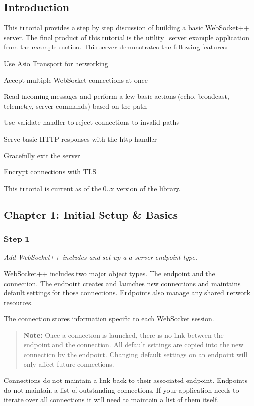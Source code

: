 \subsection*{Introduction }

This tutorial provides a step by step discussion of building a basic Web\+Socket++ server. The final product of this tutorial is the \mbox{\hyperlink{classutility__server}{utility\+\_\+server}} example application from the example section. This server demonstrates the following features\+:


\begin{DoxyItemize}
\item Use Asio Transport for networking
\item Accept multiple Web\+Socket connections at once
\item Read incoming messages and perform a few basic actions (echo, broadcast, telemetry, server commands) based on the path
\item Use validate handler to reject connections to invalid paths
\item Serve basic H\+T\+TP responses with the http handler
\item Gracefully exit the server
\item Encrypt connections with T\+LS
\end{DoxyItemize}

This tutorial is current as of the 0..\+x version of the library.

\subsection*{Chapter 1\+: Initial Setup \& Basics }

\subsubsection*{Step 1}

{\itshape Add Web\+Socket++ includes and set up a a server endpoint type.}

Web\+Socket++ includes two major object types. The endpoint and the connection. The endpoint creates and launches new connections and maintains default settings for those connections. Endpoints also manage any shared network resources.

The connection stores information specific to each Web\+Socket session.

\begin{quote}
{\bfseries Note\+:} Once a connection is launched, there is no link between the endpoint and the connection. All default settings are copied into the new connection by the endpoint. Changing default settings on an endpoint will only affect future connections. \end{quote}
Connections do not maintain a link back to their associated endpoint. Endpoints do not maintain a list of outstanding connections. If your application needs to iterate over all connections it will need to maintain a list of them itself.

